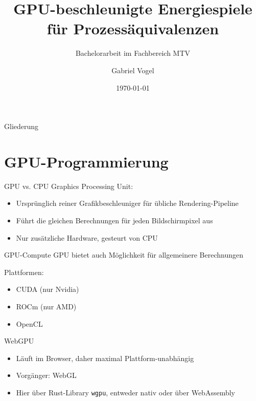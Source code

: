 \documentclass{beamer}
\title[]{GPU-beschleunigte Energiespiele für Prozessäquivalenzen}
\subtitle{Bachelorarbeit im Fachbereich MTV}
\author{Gabriel Vogel}
\date{\today}
\begin{document}
\begin{frame}
    \titlepage
\end{frame}

\begin{frame}{Gliederung}
    \tableofcontents
\end{frame}


\section{GPU-Programmierung}

\begin{frame}{GPU vs. CPU}
    Graphics Processing Unit:
    \begin{itemize}
        \item Ursprünglich reiner Grafikbeschleuniger für übliche
            Rendering-Pipeline
        \item Führt die gleichen Berechnungen für jeden Bildschirmpixel aus
        \item Nur zusätzliche Hardware, gesteurt von CPU
    \end{itemize}
\end{frame}

\begin{frame}{GPU-Compute}
    GPU bietet auch Möglichkeit für allgemeinere Berechnungen

    Plattformen:
    \begin{itemize}
        \item CUDA (nur Nvidia)
        \item ROCm (nur AMD)
        \item OpenCL
    \end{itemize}
\end{frame}

\begin{frame}{WebGPU}
    \begin{itemize}
        \item Läuft im Browser, daher maximal Plattform-unabhängig
        \item Vorgänger: WebGL
        \item Hier über Rust-Library \texttt{wgpu},
            entweder nativ oder über WebAssembly
    \end{itemize}



\end{frame}
\end{document}
